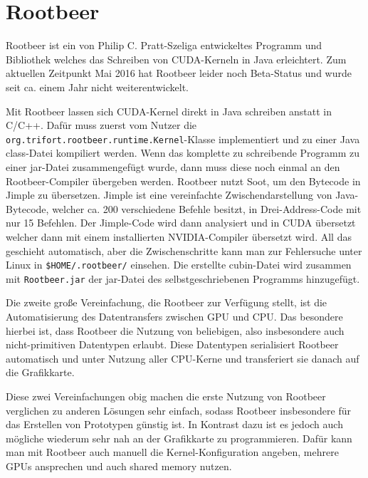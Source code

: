 \chapter{Rootbeer}
\label{sct:rootbeer}

Rootbeer\cite{pratt2012rootbeer} ist ein von Philip C. Pratt-Szeliga entwickeltes Programm und Bibliothek welches das Schreiben von CUDA-Kerneln in Java erleichtert. Zum aktuellen Zeitpunkt Mai 2016 hat Rootbeer leider noch Beta-Status und wurde seit ca. einem Jahr nicht weiterentwickelt\cite{rootbeergithub}.

Mit Rootbeer lassen sich CUDA-Kernel direkt in Java schreiben anstatt in C/C++. Dafür muss zuerst vom Nutzer die \texttt{org.trifort.rootbeer.runtime.Kernel}-Klasse implementiert und zu einer Java class-Datei kompiliert werden.
Wenn das komplette zu schreibende Programm zu einer jar-Datei zusammengefügt wurde, dann muss diese noch einmal an den Rootbeer-Compiler übergeben werden. Rootbeer nutzt Soot\cite{sootsite,sootretrospective}, um den Bytecode in Jimple zu übersetzen. Jimple ist eine vereinfachte Zwischendarstellung von Java-Bytecode, welcher ca. 200 verschiedene Befehle besitzt, in Drei-Address-Code mit nur 15 Befehlen.
Der Jimple-Code wird dann analysiert und in CUDA übersetzt welcher dann mit einem installierten NVIDIA-Compiler übersetzt wird. All das geschieht automatisch, aber die Zwischenschritte kann man zur Fehlersuche unter Linux in \lstinline!$HOME/.rootbeer/! einsehen.
Die erstellte cubin-Datei wird zusammen mit \texttt{Rootbeer.jar} der jar-Datei des selbstgeschriebenen Programms hinzugefügt.

Die zweite große Vereinfachung, die Rootbeer zur Verfügung stellt, ist die Automatisierung des Datentransfers zwischen GPU und CPU. Das besondere hierbei ist, dass Rootbeer die Nutzung von beliebigen, also insbesondere auch nicht-primitiven Datentypen erlaubt. Diese Datentypen serialisiert Rootbeer automatisch und unter Nutzung aller CPU-Kerne und transferiert sie danach auf die Grafikkarte.

Diese zwei Vereinfachungen obig machen die erste Nutzung von Rootbeer verglichen zu anderen Lösungen sehr einfach, sodass Rootbeer insbesondere für das Erstellen von Prototypen günstig ist.
In Kontrast dazu ist es jedoch auch mögliche wiederum sehr nah an der Grafikkarte zu programmieren. Dafür kann man mit Rootbeer auch manuell die Kernel-Konfiguration angeben, mehrere GPUs ansprechen und auch shared memory nutzen.


